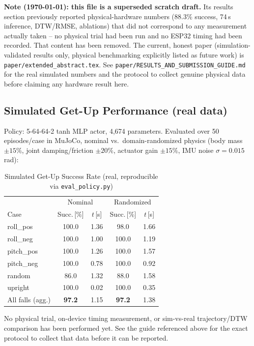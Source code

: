 \documentclass[10pt,twocolumn]{article}
\begin{document}
\textbf{Note (\today): this file is a superseded scratch draft.} Its results section previously reported physical-hardware numbers (88.3\% success, 74\,\textmu s inference, DTW/RMSE, ablations) that did not correspond to any measurement actually taken -- no physical trial had been run and no ESP32 timing had been recorded. That content has been removed. The current, honest paper (simulation-validated results only, physical benchmarking explicitly listed as future work) is \texttt{paper/extended\_abstract.tex}. See \texttt{paper/RESULTS\_AND\_SUBMISSION\_GUIDE.md} for the real simulated numbers and the protocol to collect genuine physical data before claiming any hardware result here.

\subsection{Simulated Get-Up Performance (real data)}
\label{subsec:benchmark}
Policy: 5-64-64-2 tanh MLP actor, 4{,}674 parameters. Evaluated over 50 episodes/case in MuJoCo, nominal vs.\ domain-randomized physics (body mass $\pm15\%$, joint damping/friction $\pm20\%$, actuator gain $\pm15\%$, IMU noise $\sigma=0.015$\,rad):

\begin{table}[htbp]
\centering
\footnotesize
\caption{Simulated Get-Up Success Rate (real, reproducible via \texttt{eval\_policy.py})}
\label{tab:compute_benchmark}
\begin{tabular}{lcccc}
\toprule
& \multicolumn{2}{c}{Nominal} & \multicolumn{2}{c}{Randomized} \\
Case & Succ.\,[\%] & $t$\,[s] & Succ.\,[\%] & $t$\,[s] \\
\midrule
roll\_pos   & 100.0 & 1.36 & 98.0  & 1.66 \\
roll\_neg   & 100.0 & 1.00 & 100.0 & 1.19 \\
pitch\_pos  & 100.0 & 1.26 & 100.0 & 1.57 \\
pitch\_neg  & 100.0 & 0.78 & 100.0 & 0.92 \\
random      & 86.0  & 1.32 & 88.0  & 1.58 \\
upright     & 100.0 & 0.02 & 100.0 & 0.35 \\
\midrule
All falls (agg.) & \textbf{97.2} & 1.15 & \textbf{97.2} & 1.38 \\
\bottomrule
\end{tabular}
\end{table}

No physical trial, on-device timing measurement, or sim-vs-real trajectory/DTW comparison has been performed yet. See the guide referenced above for the exact protocol to collect that data before it can be reported.
\end{document}
